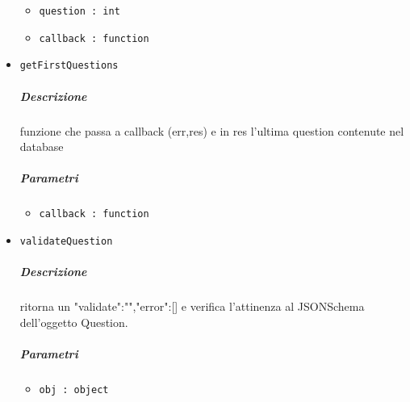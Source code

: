 \documentclass[../ManualeSviluppatore_v1.0.0.tex]{subfiles}
\begin{document}
\begin{itemize}
\begin{itemize}
	\item \texttt{question : int}
	\item \texttt{callback : function}
\end{itemize}
\item \texttt{getFirstQuestions}
\subparagraph{Descrizione}funzione che passa a callback (err,res) e in res l'ultima question contenute nel database
\subparagraph{Parametri}
\begin{itemize}
	\item \texttt{callback : function}
\end{itemize}
\item \texttt{validateQuestion}
\subparagraph{Descrizione}ritorna un {"validate":"","error":[]}  e verifica l'attinenza al JSONSchema dell'oggetto Question.
\subparagraph{Parametri}
\begin{itemize}
	\item \texttt{obj : object}
\end{itemize}
\end{itemize}
\end{document}
